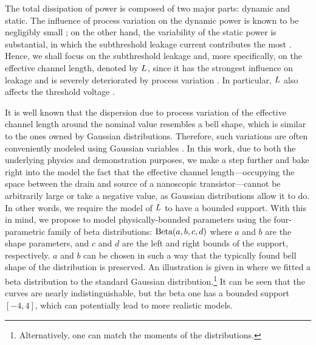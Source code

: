 The total dissipation of power is composed of two major parts: dynamic and static.
The influence of process variation on the dynamic power is known to be negligibly small \cite{srivastava2010}; on the other hand, the variability of the static power is substantial, in which the subthreshold leakage current contributes the most \cite{juan2011, juan2012}.
Hence, we shall focus on the subthreshold leakage and, more specifically, on the effective channel length, denoted by $L$, since it has the strongest influence on leakage and is severely deteriorated by process variation \cite{chandrakasan2001}.
In particular, $L$ also affects the threshold voltage \cite{juan2011}.

It is well known that the dispersion due to process variation of the effective channel length around the nominal value resembles a bell shape, which is similar to the ones owned by Gaussian distributions.
Therefore, such variations are often conveniently modeled using Gaussian variables \cite{srivastava2010, juan2011, juan2012, chandra2010, huang2009, lee2013, shen2009, bhardwaj2006, ghanta2006}.
In this work, due to both the underlying physics and demonstration purposes, we make a step further and bake right into the model the fact that the effective channel length---occupying the space between the drain and source of a nanoscopic transistor---cannot be arbitrarily large or take a negative value, as Gaussian distributions allow it to do.
In other words, we require the model of $L$ to have a bounded support.
With this in mind, we propose to model physically-bounded parameters using the four-parametric family of beta distributions: $\text{Beta}(a, b, c, d)$ where $a$ and $b$ are the shape parameters, and $c$ and $d$ are the left and right bounds of the support, respectively.
$a$ and $b$ can be chosen in such a way that the typically found bell shape of the distribution is preserved.
An illustration is given in  where we fitted a beta distribution to the standard Gaussian distribution.\footnote{Alternatively, one can match the moments of the distributions.}
It can be seen that the curves are nearly indistinguishable, but the beta one has a bounded support $[-4, 4]$, which can potentially lead to more realistic models.

